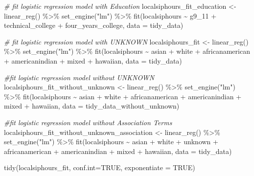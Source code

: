 \documentclass[
  11 pt,
]{article}
\newenvironment{Shaded}{\begin{snugshade}}{\end{snugshade}}
\newcommand{\AttributeTok}[1]{\textcolor[rgb]{0.77,0.63,0.00}{#1}}
\newcommand{\CommentTok}[1]{\textcolor[rgb]{0.56,0.35,0.01}{\textit{#1}}}
\newcommand{\ConstantTok}[1]{\textcolor[rgb]{0.00,0.00,0.00}{#1}}
\newcommand{\FunctionTok}[1]{\textcolor[rgb]{0.00,0.00,0.00}{#1}}
\newcommand{\NormalTok}[1]{#1}
\newcommand{\OtherTok}[1]{\textcolor[rgb]{0.56,0.35,0.01}{#1}}
\newcommand{\SpecialCharTok}[1]{\textcolor[rgb]{0.00,0.00,0.00}{#1}}
\newcommand{\StringTok}[1]{\textcolor[rgb]{0.31,0.60,0.02}{#1}}
\begin{document}
\begin{Shaded}
\begin{Highlighting}[]
\CommentTok{\# fit logistic regression model with Education}
\NormalTok{localsiphours\_fit\_education }\OtherTok{\textless{}{-}} \FunctionTok{linear\_reg}\NormalTok{() }\SpecialCharTok{\%\textgreater{}\%}
  \FunctionTok{set\_engine}\NormalTok{(}\StringTok{"lm"}\NormalTok{) }\SpecialCharTok{\%\textgreater{}\%}
  \FunctionTok{fit}\NormalTok{(localsiphours }\SpecialCharTok{\textasciitilde{}}\NormalTok{ g9\_11 }\SpecialCharTok{+}\NormalTok{ technical\_college }\SpecialCharTok{+}\NormalTok{ four\_years\_college, }\AttributeTok{data =}\NormalTok{ tidy\_data)}

\CommentTok{\# fit logistic regression model with UNKNOWN}
\NormalTok{localsiphours\_fit }\OtherTok{\textless{}{-}} \FunctionTok{linear\_reg}\NormalTok{() }\SpecialCharTok{\%\textgreater{}\%}
  \FunctionTok{set\_engine}\NormalTok{(}\StringTok{"lm"}\NormalTok{) }\SpecialCharTok{\%\textgreater{}\%}
  \FunctionTok{fit}\NormalTok{(localsiphours }\SpecialCharTok{\textasciitilde{}}\NormalTok{ asian }\SpecialCharTok{+}\NormalTok{ white }\SpecialCharTok{+}\NormalTok{ africanamerican }\SpecialCharTok{+}\NormalTok{ americanindian }\SpecialCharTok{+}\NormalTok{ mixed }\SpecialCharTok{+}\NormalTok{ hawaiian, }\AttributeTok{data =}\NormalTok{ tidy\_data)}

\CommentTok{\#fit logistic regression model without UNKNOWN}
\NormalTok{localsiphours\_fit\_without\_unknown }\OtherTok{\textless{}{-}} \FunctionTok{linear\_reg}\NormalTok{() }\SpecialCharTok{\%\textgreater{}\%}
  \FunctionTok{set\_engine}\NormalTok{(}\StringTok{"lm"}\NormalTok{) }\SpecialCharTok{\%\textgreater{}\%}
  \FunctionTok{fit}\NormalTok{(localsiphours }\SpecialCharTok{\textasciitilde{}}\NormalTok{ asian }\SpecialCharTok{+}\NormalTok{ white }\SpecialCharTok{+}\NormalTok{ africanamerican }\SpecialCharTok{+}\NormalTok{ americanindian }\SpecialCharTok{+}\NormalTok{ mixed }\SpecialCharTok{+}\NormalTok{ hawaiian, }\AttributeTok{data =}\NormalTok{ tidy\_data\_without\_unknown)}

\CommentTok{\#fit logistic regression model without Association Terms}
\NormalTok{localsiphours\_fit\_without\_unknown\_association }\OtherTok{\textless{}{-}} \FunctionTok{linear\_reg}\NormalTok{() }\SpecialCharTok{\%\textgreater{}\%}
  \FunctionTok{set\_engine}\NormalTok{(}\StringTok{"lm"}\NormalTok{) }\SpecialCharTok{\%\textgreater{}\%}
  \FunctionTok{fit}\NormalTok{(localsiphours }\SpecialCharTok{\textasciitilde{}}\NormalTok{ asian }\SpecialCharTok{+}\NormalTok{ white }\SpecialCharTok{+}\NormalTok{ unknown }\SpecialCharTok{+}\NormalTok{ africanamerican }\SpecialCharTok{+}\NormalTok{ americanindian }\SpecialCharTok{+}\NormalTok{ mixed }\SpecialCharTok{+}\NormalTok{ hawaiian, }\AttributeTok{data =}\NormalTok{ tidy\_data)}

\FunctionTok{tidy}\NormalTok{(localsiphours\_fit, }\AttributeTok{conf.int=}\ConstantTok{TRUE}\NormalTok{, }\AttributeTok{exponentiate =} \ConstantTok{TRUE}\NormalTok{)}
\end{Highlighting}
\end{Shaded}
\end{document}
